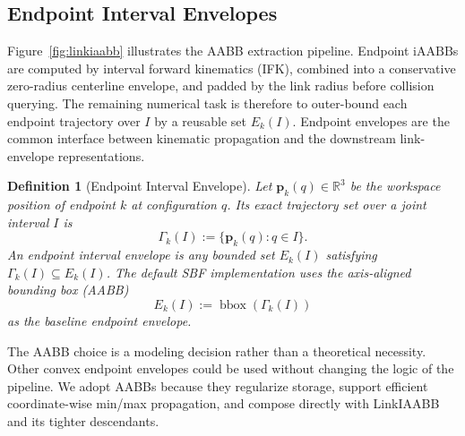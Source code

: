 \documentclass[journal]{IEEEtran}
\DeclareRobustCommand{\textsc}[1]{\textnormal{\MakeUppercase{#1}}}
\newtheorem{definition}{Definition}
\newcommand{\sbf}{\textsc{SBF}}
\newcommand{\iAABB}{\ensuremath{\mathrm{iAABB}}}
\newcommand{\Real}{\ensuremath{\mathbb{R}}}
\begin{document}
\subsection{Endpoint Interval Envelopes}\label{sec:rewrite_endpoint_env}

\noindent Figure~\ref{fig:linkiaabb} illustrates the AABB extraction pipeline.
Endpoint \iAABB{}s are computed by interval forward kinematics (IFK), combined
into a conservative zero-radius centerline envelope, and padded by the link
radius before collision querying. The remaining numerical task is therefore to
outer-bound each endpoint trajectory over $I$ by a reusable set $E_k(I)$.
Endpoint envelopes are the common interface between kinematic propagation and
the downstream link-envelope representations.

\begin{definition}[Endpoint Interval Envelope]\label{def:endpoint_env}
Let $\bm{p}_k(q) \in \Real^3$ be the workspace position of endpoint $k$ at
configuration $q$. Its exact trajectory set over a joint interval $I$ is
\[
\Gamma_k(I) := \{\bm{p}_k(q) : q\in I\}.
\]
An endpoint interval envelope is any bounded set $E_k(I)$ satisfying
$\Gamma_k(I) \subseteq E_k(I)$. The default \sbf{} implementation uses the
axis-aligned bounding box (AABB)
\[
E_k(I) := \operatorname{bbox}(\Gamma_k(I))
\]
as the baseline endpoint envelope.
\end{definition}

The AABB choice is a modeling decision rather than a theoretical necessity.
Other convex endpoint envelopes could be used without changing the logic of the
pipeline. We adopt AABBs because they regularize storage, support efficient
coordinate-wise min/max propagation, and compose directly with LinkIAABB and
its tighter descendants.
\end{document}
